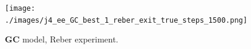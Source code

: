 \documentclass[11pt, a4paper]{article}
\begin{document}
\begin{figure}
\texttt{[image: ./images/j4\_ee\_GC\_best\_1\_reber\_exit\_true\_steps\_1500.png]}
\caption{$\mathbf{GC}$ model, Reber experiment.}
\label{f:GCreber}
\end{figure}


\end{document}
